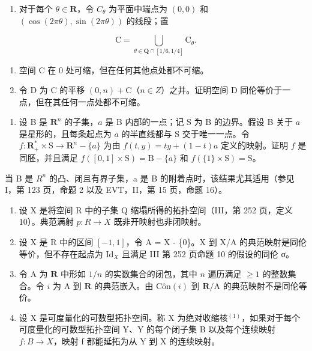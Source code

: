 \exercisegroup

\begin{enumerate}
\def\labelenumi{\arabic{enumi})}
\tightlist
\item
  对于每个 \(\theta \in \mathbf{R}\)，令 \(C_{\theta}\) 为平面中端点为 \((0,0)\) 和 \((\cos(2\pi\theta), \sin(2\pi\theta))\) 的线段；置
\end{enumerate}

\[
\mathrm{C} = \bigcup_ {\theta \in \mathbf {Q} \cap [ 1 / 6, 1 / 4 ]} \mathrm{C} _ {\theta}.
\]

\begin{enumerate}
\def\labelenumi{\alph{enumi})}
\item
  空间 C 在 0 处可缩，但在任何其他点处都不可缩。
\item
  令 D 为 C 的平移 \((0, n) + \mathrm{C}\)（\(n \in Z\)）之并。证明空间 D 同伦等价于一点，但在其任何一点处都不可缩。
\end{enumerate}

\begin{enumerate}
\def\labelenumi{\arabic{enumi})}
\setcounter{enumi}{1}
\tightlist
\item
  设 B 是 \(\mathbf{R}^{n}\) 的子集，\(a\) 是 B 内部的一点；记 S 为 B 的边界。假设 B 关于 \(a\) 是星形的，且每条起点为 \(a\) 的半直线都与 S 交于唯一一点。令 \(f\colon\mathbf{R}_{+}^{*}\times\mathrm{S}\to\mathbf{R}^{n}-\{a\}\) 为由 \(f(t,y)=ty+(1-t)a\) 定义的映射。证明 \(f\) 是同胚，并且满足 \(f([0,1]\times\mathrm{S})=\mathrm{B}-\{a\}\) 和 \(f(\{1\}\times\mathrm{S})=\mathrm{S}\)。
\end{enumerate}

当 B 是 \(R^{n}\) 的凸、闭且有界子集，a 是 B 的附着点时，该结果尤其适用（参见 I，第 123 页，命题 2 以及 EVT，II，第 15 页，命题 16）。

\begin{enumerate}
\def\labelenumi{\arabic{enumi})}
\setcounter{enumi}{2}
\item
  设 X 是将空间 R 中的子集 Q 缩塌所得的拓扑空间（III，第 252 页，定义 10）。典范满射 \(p: R \rightarrow X\) 既非开映射也非闭映射。
\item
  设 X 是 R 中的区间 \([-1,1]\)，令 A = X - \{0\}。X 到 X/A 的典范映射是同伦等价，但不存在起点为 \(\mathrm{Id}_{X}\) 且满足 III 第 252 页命题 10 的假设的同伦 σ。
\item
  令 A 为 \(\mathbf{R}\) 中形如 \(1/n\) 的实数集合的闭包，其中 \(n\) 遍历满足 \(\geqslant 1\) 的整数集合。令 \(i\) 为 A 到 \(\mathbf{R}\) 的典范嵌入。由 \(\mathrm{Côn}(i)\) 到 \(\mathbf{R}/\mathrm{A}\) 的典范映射不是同伦等价。
\item
  设 X 是可度量化的可数型拓扑空间。称 X 为绝对收缩核\(^{(1)}\)，如果对于每个可度量化的可数型拓扑空间 Y、Y 的每个闭子集 B 以及每个连续映射 \(f: B \to X\)，映射 f 都能延拓为从 Y 到 X 的连续映射。
\end{enumerate}

